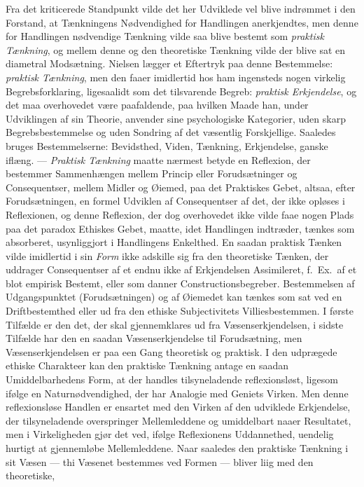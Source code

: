 \documentclass[12pt,a4paper]{book}
\newcommand{\opage}[1]{\marginnote{\footnotesize\textit{[#1]}}}
\begin{document}
Fra det kriticerede Standpunkt vilde det her Udviklede vel blive
indrømmet i den Forstand, at Tænkningens Nødvendighed for Handlingen
anerkjendtes, men denne for Handlingen nødvendige Tænkning vilde saa
blive bestemt som \emph{praktisk Tænkning}, og mellem denne og den theoretiske
Tænkning vilde der blive sat en diametral Modsætning. Nielsen lægger et
Eftertryk paa denne Bestemmelse: \emph{praktisk Tænkning}, men den faaer
imidlertid hos ham ingensteds nogen virkelig Begrebsforklaring,
ligesaalidt som det tilsvarende Begreb: \emph{praktisk Erkjendelse}, og det
maa overhovedet være paafaldende, paa hvilken Maade han, under
Udviklingen af sin Theorie, anvender sine psychologiske Kategorier, uden
skarp Begrebsbestemmelse og uden Sondring af det væsentlig
Forskjellige. Saaledes bruges Bestemmelserne: Bevidsthed, Viden,
Tænkning, Erkjendelse, ganske iflæng. --- \emph{Praktisk Tænkning} maatte
nærmest betyde en Reflexion, der bestemmer Sammenhængen mellem Princip
eller Forudsætninger og Consequentser, mellem Midler og Øiemed, paa det
Praktiskes Gebet, altsaa, efter Forudsætningen, en formel Udviklen af
Consequentser af det, der ikke opløses i Reflexionen, og denne
Reflexion, der dog overhovedet ikke vilde faae nogen Plads paa det
paradox Ethiskes Gebet, maatte, idet Handlingen indtræder, tænkes som
absorberet, usynliggjort i Handlingens Enkelthed. En saadan praktisk
Tænken vilde imidlertid i sin \emph{Form} ikke adskille sig fra den
theoretiske Tænken, der uddrager Consequentser af et endnu ikke af
Erkjendelsen Assimileret, f.~Ex.\ af et blot empirisk Bestemt, eller
som danner Constructionsbegreber. Bestemmelsen af Udgangspunktet
(Forudsætningen) og af Øiemedet kan tænkes som sat ved en
Driftbestemthed eller ud fra den ethiske Subjectivitets Villiesbestemmen.
I første Tilfælde er den det, der skal gjennemklares ud fra
Væsenserkjendelsen, i sidste Tilfælde har den en saadan
Væsenserkjendelse til Forudsætning, men Væsenserkjendelsen er paa een
Gang theoretisk og praktisk. I den udprægede ethiske \opage{147}Charakteer kan den
praktiske Tænkning antage en saadan Umiddelbarhedens Form, at der
handles tilsyneladende reflexionsløst, ligesom ifølge en
Naturnødvendighed, der har Analogie med Geniets Virken. Men denne
reflexionsløse Handlen er ensartet med den Virken af den udviklede
Erkjendelse, der tilsyneladende overspringer Mellemleddene og
umiddelbart naaer Resultatet, men i Virkeligheden gjør det ved, ifølge
Reflexionens Uddannethed, uendelig hurtigt at gjennemløbe
Mellemleddene. Naar saaledes den praktiske Tænkning i sit Væsen ---
thi Væsenet bestemmes ved Formen --- bliver liig med den theoretiske,
\end{document}
